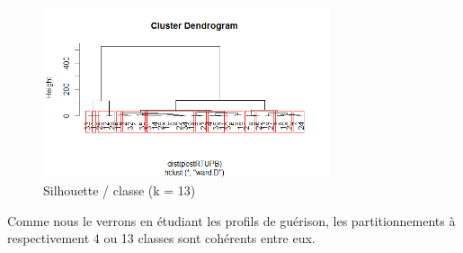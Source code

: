 \begin{figure}[H]
\centering
\includegraphics[width=0.75\textwidth]{../Fig/RTUPB/rtupb-cah-k13-post.png}
\caption{Silhouette / classe (k = 13)}
\end{figure}

Comme nous le verrons en étudiant les profils de guérison, les partitionnements à respectivement 4 ou 13 classes sont cohérents entre eux. 

%
